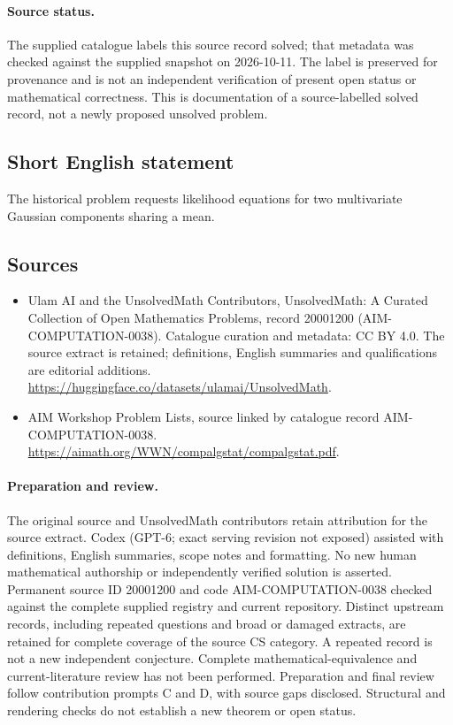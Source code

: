 \documentclass[11pt]{article}
\begin{document}
\paragraph{Source status.}
The supplied catalogue labels this source record solved; that metadata was checked against the supplied snapshot on 2026-10-11. The label is preserved for provenance and is not an independent verification of present open status or mathematical correctness. This is documentation of a source-labelled solved record, not a newly proposed unsolved problem.
\subsection{Short English statement}
The historical problem requests likelihood equations for two multivariate Gaussian components sharing a mean.
\subsection{Sources}
\begin{itemize}
\item[\hypertarget{source:20001200:1}{S1}] Ulam AI and the UnsolvedMath Contributors, UnsolvedMath: A Curated Collection of Open Mathematics Problems, record 20001200 (AIM-COMPUTATION-0038). Catalogue curation and metadata: CC BY 4.0. The source extract is retained; definitions, English summaries and qualifications are editorial additions.
\url{https://huggingface.co/datasets/ulamai/UnsolvedMath}.
\item[\hypertarget{source:20001200:2}{S2}] AIM Workshop Problem Lists, source linked by catalogue record AIM-COMPUTATION-0038.
\url{https://aimath.org/WWN/compalgstat/compalgstat.pdf}.
\end{itemize}
\paragraph{Preparation and review.}
The original source and UnsolvedMath contributors retain attribution for the source extract. Codex (GPT-6; exact serving revision not exposed) assisted with definitions, English summaries, scope notes and formatting. No new human mathematical authorship or independently verified solution is asserted. Permanent source ID 20001200 and code AIM-COMPUTATION-0038 checked against the complete supplied registry and current repository. Distinct upstream records, including repeated questions and broad or damaged extracts, are retained for complete coverage of the source CS category. A repeated record is not a new independent conjecture. Complete mathematical-equivalence and current-literature review has not been performed. Preparation and final review follow contribution prompts C and D, with source gaps disclosed. Structural and rendering checks do not establish a new theorem or open status.
\label{end:20001200}
\end{document}
